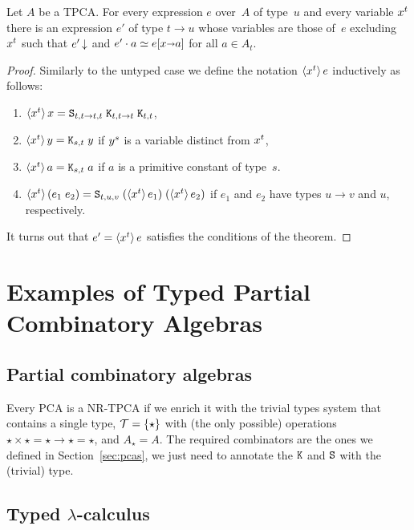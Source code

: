 \begin{theorem}
  Let $A$ be a TPCA. For every expression $e$ over~$A$ of type~$u$ and
  every variable $x^{t}$ there is an expression $e'$ of type $t
  \to u$ whose variables are those of~$e$ excluding~$x^{t}$
  such that $e'\,{\downarrow}$ and $e' \cdot a \simeq e[x {\shortrightarrow}
    a]$ for all $a \in A_t$.
\end{theorem}

\begin{proof}
  Similarly to the untyped case we define the notation
  $\langle x^{t} \rangle\,e$ inductively as follows:
  \begin{enumerate}
  \item $\langle x^{t} \rangle\,x = \mathtt{S}_{t,t \to t,t} \; \mathtt{K}_{t,t \to
      t} \; \mathtt{K}_{t,t}$,
  \item $\langle x^{t} \rangle\,y = \mathtt{K}_{s,t}\; y$ if $y^{s}$ is a
    variable distinct from $x^{t}$,
  \item $\langle x^{t} \rangle\,a = \mathtt{K}_{s,t} \; a$ if $a$ is a primitive
    constant of type~$s$.
  \item $\langle x^{t} \rangle\,(e_1\; e_2) = \mathtt{S}_{t,u,v}\;
    (\langle x^{t} \rangle\,e_1) \; (\langle x^{t} \rangle\,e_2)$ if $e_1$ and
    $e_2$ have types $u \to v$ and $u$, respectively.
  \end{enumerate}
  It turns out that $e' = \langle x^{t} \rangle\,e$ satisfies the conditions
  of the theorem.
\end{proof}

\section{Examples of Typed Partial Combinatory Algebras}
\label{sec:examples-tpcas}

\subsection{Partial combinatory algebras}

Every PCA is a NR-TPCA if we enrich it with the trivial types system
that contains a single type, $\mathcal{T} = \{\star\}$ with (the
only possible) operations $\star \times \star = \star \to \star =
\star$, and $A_\star = A$. The required combinators are the ones we
defined in Section~\ref{sec:pcas}, we just need to annotate the
$\mathtt{K}$ and $\mathtt{S}$ with the (trivial) type.


\subsection{Typed $\lambda$-calculus}
\label{sec:typed-lambda-calculus}

